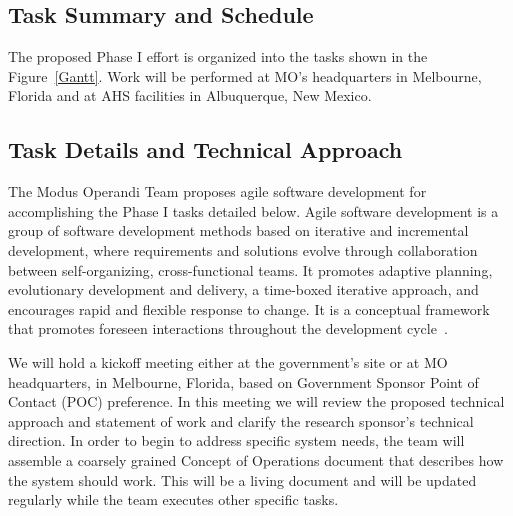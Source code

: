 \documentclass{sbir}
\begin{document}

\subsection{Task Summary and Schedule}
The proposed Phase I effort is organized into the tasks shown in the Figure~\ref{Gantt}. Work will be performed at MO's headquarters in Melbourne, Florida and at AHS facilities in Albuquerque, New Mexico.

\begin{center}
\end{center}

\subsection{Task Details and Technical Approach}
The Modus Operandi Team proposes agile software development for accomplishing the Phase I tasks detailed below. Agile software development is a group of software development methods based on iterative and incremental development, where requirements and solutions evolve through collaboration between self-organizing, cross-functional teams. It promotes adaptive planning, evolutionary development and delivery, a time-boxed iterative approach, and encourages rapid and flexible response to change. It is a conceptual framework that promotes foreseen interactions throughout the development cycle~\cite{La:03}.

We will hold a kickoff meeting either at the government's site or at MO headquarters, in Melbourne, Florida, based on Government Sponsor Point of Contact (POC) preference. In this meeting we will review the proposed technical approach and statement of work and clarify the research sponsor's technical direction. In order to begin to address specific system needs, the team will assemble a coarsely grained Concept of Operations document that describes how the system should work. This will be a living document and will be updated regularly while the team executes other specific tasks. 
\end{document}
